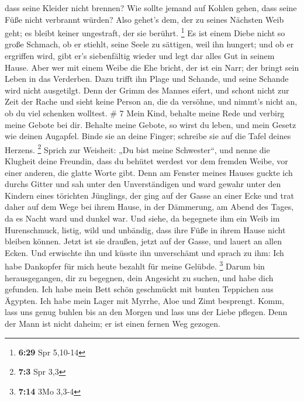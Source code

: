 dass seine Kleider nicht brennen?  Wie sollte jemand auf
Kohlen gehen, dass seine Füße nicht verbrannt würden? 
Also gehet's dem, der zu seines Nächsten Weib geht; es bleibt keiner
ungestraft, der sie berührt. \footnote{\textbf{6:29} Spr 5,10-14}
 Es ist einem Diebe nicht so große Schmach, ob er
stiehlt, seine Seele zu sättigen, weil ihn hungert;  und
ob er ergriffen wird, gibt er's siebenfältig wieder und legt dar alles
Gut in seinem Hause.  Aber wer mit einem Weibe die Ehe
bricht, der ist ein Narr; der bringt sein Leben in das Verderben.
 Dazu trifft ihn Plage und Schande, und seine Schande
wird nicht ausgetilgt.  Denn der Grimm des Mannes eifert,
und schont nicht zur Zeit der Rache  und sieht keine
Person an, die da versöhne, und nimmt's nicht an, ob du viel schenken
wolltest. \# 7  Mein Kind, behalte meine Rede und verbirg
meine Gebote bei dir.  Behalte meine Gebote, so wirst du
leben, und mein Gesetz wie deinen Augapfel.  Binde sie an
deine Finger; schreibe sie auf die Tafel deines Herzens. \footnote{\textbf{7:3}
  Spr 3,3}  Sprich zur Weisheit: „Du bist meine
Schwester``, und nenne die Klugheit deine Freundin,  dass
du behütet werdest vor dem fremden Weibe, vor einer anderen, die glatte
Worte gibt.  Denn am Fenster meines Hauses guckte ich
durchs Gitter  und sah unter den Unverständigen und ward
gewahr unter den Kindern eines törichten Jünglings,  der
ging auf der Gasse an einer Ecke und trat daher auf dem Wege bei ihrem
Hause,  in der Dämmerung, am Abend des Tages, da es Nacht
ward und dunkel war.  Und siehe, da begegnete ihm ein
Weib im Hurenschmuck, listig,  wild und unbändig, dass
ihre Füße in ihrem Hause nicht bleiben können.  Jetzt ist
sie draußen, jetzt auf der Gasse, und lauert an allen Ecken.
 Und erwischte ihn und küsste ihn unverschämt und sprach
zu ihm:  Ich habe Dankopfer für mich heute bezahlt für
meine Gelübde. \footnote{\textbf{7:14} 3Mo 3,3-4}  Darum
bin herausgegangen, dir zu begegnen, dein Angesicht zu suchen, und habe
dich gefunden.  Ich habe mein Bett schön geschmückt mit
bunten Teppichen aus Ägypten.  Ich habe mein Lager mit
Myrrhe, Aloe und Zimt besprengt.  Komm, lass uns genug
buhlen bis an den Morgen und lass uns der Liebe pflegen. 
Denn der Mann ist nicht daheim; er ist einen fernen Weg gezogen.
